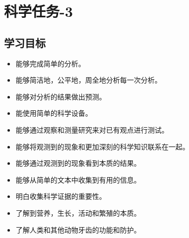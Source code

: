 \chapter{科学任务-3}


\section{学习目标}
  \begin{itemize}
      \item 能够完成简单的分析。
      \item 能够简洁地，公平地，周全地分析每一次分析。 
      \item 能够对分析的结果做出预测。
      \item 能使用简单的科学设备。
      \item 能够通过观察和测量研究来对已有观点进行测试。
      \item 能够将观测到的现象和更加深刻的科学知识联系在一起。
      \item 能够通过观测到的现象看到本质的结果。
      \item 能够从简单的文本中收集到有用的信息。
      \item 明白收集科学证据的重要性。
      \item 了解到营养，生长，活动和繁殖的本质。
      \item 了解人类和其他动物牙齿的功能和防护。
   \end{itemize}  



